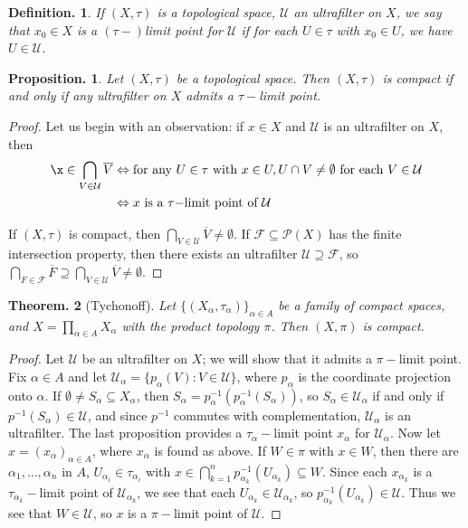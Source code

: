 \documentclass[11pt, a4paper]{memoir}
\theoremstyle{change}
\newtheorem{theorem}{Theorem.}[section]
\newtheorem{proposition}[theorem]{Proposition.}
\theoremstyle{plain}
\theoremstyle{nonumberplain}
\newtheorem{definition}{Definition.}
\newtheorem{proof}{Proof}
\numberwithin{equation}{section}
\begin{document}
\begin{definition}
    If $(X,\tau)$ is a topological space, $\mathcal{U}$ an ultrafilter on $X$, we say that $x_0\in X$ is a $(\tau-)$limit point for $\mathcal{U}$ if for each $U\in\tau$ with $x_0\in U$, we have $U\in\mathcal{U}$.
\end{definition}
\begin{proposition}
    Let $(X,\tau)$ be a topological space.
    Then $(X,\tau)$ is compact if and only if any ultrafilter on $X$ admits a $\tau-$limit point.
\end{proposition}
\begin{proof}
    Let us begin with an observation: if $x\in X$ and $\mathcal{U}$ is an ultrafilter on $X$, then
    \begin{align*}
        \x\in\bigcap_{V\in\mathcal{U}}\overline{V} &\Leftrightarrow\text{for any }U\in\tau\text{ with }x\in U, U\cap V\neq\emptyset\text{ for each }V\in \mathcal{U}\\
                                                   &\Leftrightarrow x\text{ is a $\tau-$limit point of }\mathcal{U}
    \end{align*}
    
    If $(X,\tau)$ is compact, then $\bigcap_{V\in\mathcal{U}}\overline{V}\neq\emptyset$.
    If $\mathcal{F}\subseteq\mathcal{P}(X)$ has the finite intersection property, then there exists an ultrafilter $\mathcal{U}\supseteq\mathcal{F}$, so $\bigcap_{F\in\mathcal{F}}\overline{F}\supseteq\bigcap_{V\in\mathcal{U}}\overline{V}\neq\emptyset$.

\end{proof}
\begin{theorem}[Tychonoff]
    Let $\{(X_\alpha,\tau_\alpha)\}_{\alpha\in A}$ be a family of compact spaces, and $X=\prod_{\alpha \in A}X_\alpha$ with the product topology $\pi$.
    Then $(X,\pi)$ is compact.
\end{theorem}
\begin{proof}
    Let $\mathcal{U}$ be an ultrafilter on $X$; we will show that it admits a $\pi-$limit point.
    Fix $\alpha\in A$ and let $\mathcal{U}_\alpha=\{p_\alpha(V):V\in\mathcal{U}\}$, where $p_\alpha$ is the coordinate projection onto $\alpha$.
    If $\emptyset\neq S_\alpha\subseteq X_\alpha$, then $S_\alpha=p_\alpha^{-1}(p_\alpha^{-1}(S_\alpha))$, so $S_\alpha\in\mathcal{U}_\alpha$ if and only if $p^{-1}(S_\alpha)\in\mathcal{U}$, and since $p^{-1}$ commutes with complementation, $\mathcal{U}_\alpha$ is an ultrafilter.
    The last proposition provides a $\tau_\alpha-$limit point $x_\alpha$ for $\mathcal{U}_\alpha$.
    Now let $x=(x_\alpha)_{\alpha\in A}$, where $x_\alpha$ is found as above.
    If $W\in\pi$ with $x\in W$, then there are $\alpha_1,\ldots,\alpha_n$ in $A$, $U_{\alpha_i}\in\tau_{\alpha_i}$ with $x\in\bigcap_{k=1}^n p_{\alpha_k}^{-1}(U_{\alpha_k})\subseteq W$.
    Since each $x_{\alpha_k}$ is a $\tau_{\alpha_k}-$limit point of $\mathcal{U}_{\alpha_k}$, we see that each $U_{\alpha_k}\in\mathcal{U}_{\alpha_k}$, so $p_{\alpha_k}^{-1}(U_{\alpha_k})\in\mathcal{U}$.
    Thus we see that $W\in\mathcal{U}$, so $x$ is a $\pi-$limit point of $\mathcal{U}$.
\end{proof}
\end{document}

